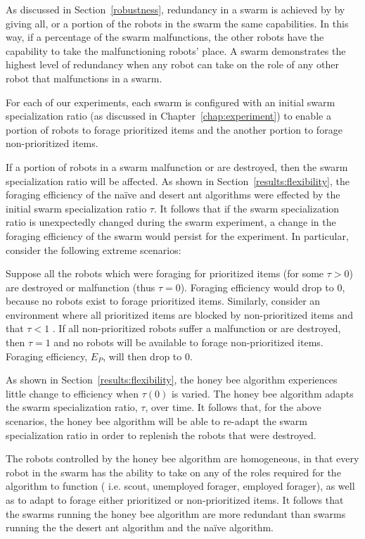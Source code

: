 As discussed in Section~\ref{robustness}, redundancy in a swarm is achieved by by giving all, or a portion of the robots in the swarm the same capabilities. In this way, if a percentage of the swarm malfunctions, the other robots have the capability to take the malfunctioning robots' place. A swarm demonstrates the highest level of redundancy when any robot can take on the role of any other robot that malfunctions in a swarm. 

For each of our experiments, each swarm is configured with an initial swarm specialization ratio (as discussed in Chapter~\ref{chap:experiment}) to enable a portion of robots to forage prioritized items and the another portion to forage non-prioritized items. 

If a portion of robots in a swarm malfunction or are destroyed, then the swarm specialization ratio will be affected. As shown in Section~\ref{results:flexibility}, the foraging efficiency of the na\"ive and desert ant algorithms were effected by the initial swarm specialization ratio $\tau$. It follows that if the swarm specialization ratio is unexpectedly changed during the swarm experiment, a change in the foraging efficiency of the swarm would persist for the experiment. In particular, consider the following extreme scenarios: 

Suppose all the robots which were foraging for prioritized items (for some $\tau > 0$) are destroyed or malfunction (thus $\tau=0$). Foraging efficiency would drop to 0, because no robots exist to forage prioritized items. Similarly, consider an environment where all prioritized items are blocked by non-prioritized items and that $\tau < 1$ . If all non-prioritized robots suffer a malfunction or are destroyed, then $\tau=1$ and no robots will be available to forage non-prioritized items. Foraging efficiency, $E_P$, will then drop to 0. 

As shown in Section~\ref{results:flexibility}, the honey bee algorithm experiences little change to efficiency when $\tau(0)$ is varied. The honey bee algorithm adapts the swarm specialization ratio, $\tau$, over time. It follows that, for the above scenarios, the honey bee algorithm will be able to re-adapt the swarm specialization ratio in order to replenish the robots that were destroyed. 

The robots controlled by the honey bee algorithm are homogeneous, in that every robot in the swarm has the ability to take on any of the roles required for the algorithm to function ( i.e. scout, unemployed forager, employed forager), as well as to adapt to forage either prioritized or non-prioritized items. It follows that the swarms running the honey bee algorithm are more redundant than swarms running the the desert ant algorithm and the na\"ive algorithm.

